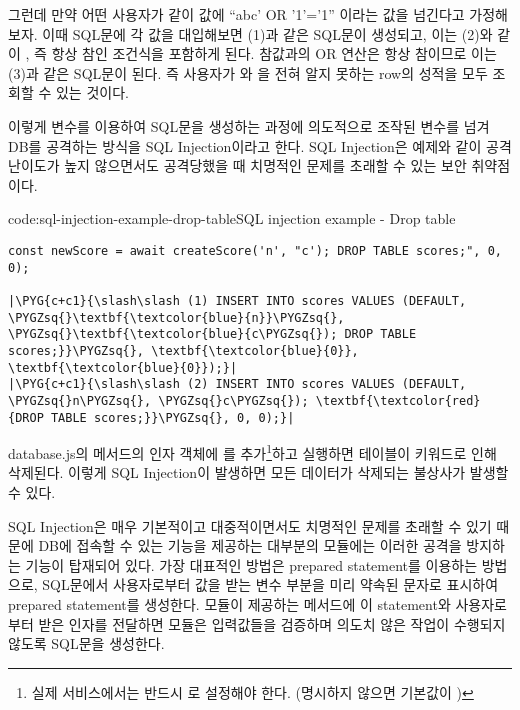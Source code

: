 그런데 만약 어떤 사용자가 \과 같이  값에 ``abc' OR '1'='1'' 이라는 값을 넘긴다고 가정해보자. 이때 SQL문에 각 값을 대입해보면 (1)과 같은 SQL문이 생성되고, 이는 (2)와 같이 , 즉 항상 참인 조건식을 포함하게 된다. 참값과의 OR 연산은 항상 참이므로 이는 (3)과 같은 SQL문이 된다. 즉 사용자가 와 을 전혀 알지 못하는 row의 성적을 모두 조회할 수 있는 것이다.

이렇게 변수를 이용하여 SQL문을 생성하는 과정에 의도적으로 조작된 변수를 넘겨 DB를 공격하는 방식을 SQL Injection이라고 한다. SQL Injection은 예제와 같이 공격 난이도가 높지 않으면서도 공격당했을 때 치명적인 문제를 초래할 수 있는 보안 취약점이다.

\begin{code}{code:sql-injection-example-drop-table}{SQL injection example - Drop table}
\begin{verbatim}
const newScore = await createScore('n', "c'); DROP TABLE scores;", 0, 0);

|\PYG{c+c1}{\slash\slash (1) INSERT INTO scores VALUES (DEFAULT, \PYGZsq{}\textbf{\textcolor{blue}{n}}\PYGZsq{}, \PYGZsq{}\textbf{\textcolor{blue}{c\PYGZsq{}); DROP TABLE scores;}}\PYGZsq{}, \textbf{\textcolor{blue}{0}}, \textbf{\textcolor{blue}{0}});}|
|\PYG{c+c1}{\slash\slash (2) INSERT INTO scores VALUES (DEFAULT, \PYGZsq{}n\PYGZsq{}, \PYGZsq{}c\PYGZsq{}); \textbf{\textcolor{red}{DROP TABLE scores;}}\PYGZsq{}, 0, 0);}|
\end{verbatim}
\end{code}

database.js의  메서드의 인자 객체에 를 추가\footnote{실제 서비스에서는 반드시 로 설정해야 한다. (명시하지 않으면 기본값이 )}하고 \을 실행하면  테이블이  키워드로 인해 삭제된다. 이렇게 SQL Injection이 발생하면 모든 데이터가 삭제되는 불상사가 발생할 수 있다.

SQL Injection은 매우 기본적이고 대중적이면서도 치명적인 문제를 초래할 수 있기 때문에 DB에 접속할 수 있는 기능을 제공하는 대부분의 모듈에는 이러한 공격을 방지하는 기능이 탑재되어 있다. 가장 대표적인 방법은 prepared statement를 이용하는 방법으로, SQL문에서 사용자로부터 값을 받는 변수 부분을 미리 약속된 문자로 표시하여 prepared statement를 생성한다. 모듈이 제공하는 메서드에 이 statement와 사용자로부터 받은 인자를 전달하면 모듈은 입력값들을 검증하며 의도치 않은 작업이 수행되지 않도록 SQL문을 생성한다.

